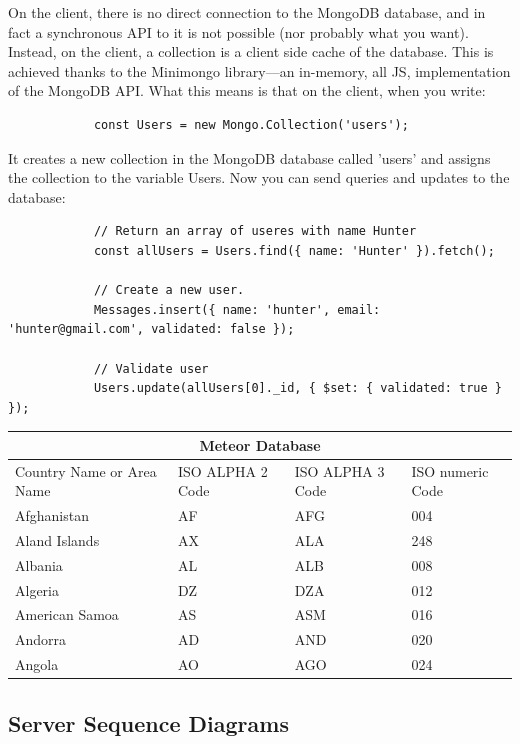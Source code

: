 \documentclass[12pt,a4paper]{report}
\begin{document}
		
		
		On the client, there is no direct connection to the MongoDB database, and in fact a synchronous API to it is not possible (nor probably what you want). Instead, on the client, a collection is a client side cache of the database. This is achieved thanks to the Minimongo library—an in-memory, all JS, implementation of the MongoDB API. What this means is that on the client, when you write:
		
		\begin{lstlisting}
			const Users = new Mongo.Collection('users');
		\end{lstlisting}
		
		It creates a new collection in the MongoDB database called 'users' and assigns the collection to the variable Users. Now you can send queries and updates to the database:
		
		\begin{lstlisting}
			// Return an array of useres with name Hunter
			const allUsers = Users.find({ name: 'Hunter' }).fetch();
			
			// Create a new user.
			Messages.insert({ name: 'hunter', email: 'hunter@gmail.com', validated: false });
			
			// Validate user
			Users.update(allUsers[0]._id, { $set: { validated: true } });
		\end{lstlisting}
		
		
		
		
		\begin{tabular}{ |p{3cm}||p{3cm}|p{3cm}|p{3cm}|  }
			\hline
			\multicolumn{4}{|c|}{Meteor Database} \\
			\hline
			Country Name     or Area Name& ISO ALPHA 2 Code &ISO ALPHA 3 Code&ISO numeric Code\\
			\hline
			Afghanistan   & AF    &AFG&   004\\
			Aland Islands&   AX  & ALA   &248\\
			Albania &AL & ALB&  008\\
			Algeria    &DZ & DZA&  012\\
			American Samoa&   AS  & ASM&016\\
			Andorra& AD  & AND   &020\\
			Angola& AO  & AGO&024\\
			\hline
		\end{tabular}
		
	\subsection{Server Sequence Diagrams}
\end{document}
